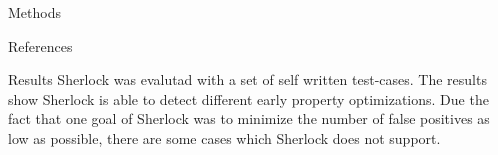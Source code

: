 \documentclass[a1paper,portrait,fontscale=0.418]{baposter}
\newcommand{\js}[1]{\lstinline[language=Javascript]$#1$}
\begin{document}
\begin{poster}
\begin{posterbox}[name=methods,column=0,below=introduction]{Methods}
\begin{center}
\end{center}
%
%
%
%
\end{posterbox}


\begin{posterbox}[name=references,column=0,below=methods]{References}

\smaller %
\renewcommand{\section}[2]{\vskip 0.05em} %
\nocite{*} %


\end{posterbox}




\begin{posterbox}[name=results1,span=2,column=1,row=0]{Results} 
Sherlock was evalutad with a set of self written test-cases. The results show Sherlock is able to detect different early property optimizations. Due the fact that one goal of Sherlock was to minimize the number of false positives as low as possible, there are some cases which Sherlock does not support.\\


\end{posterbox}
\end{poster}
\end{document}
